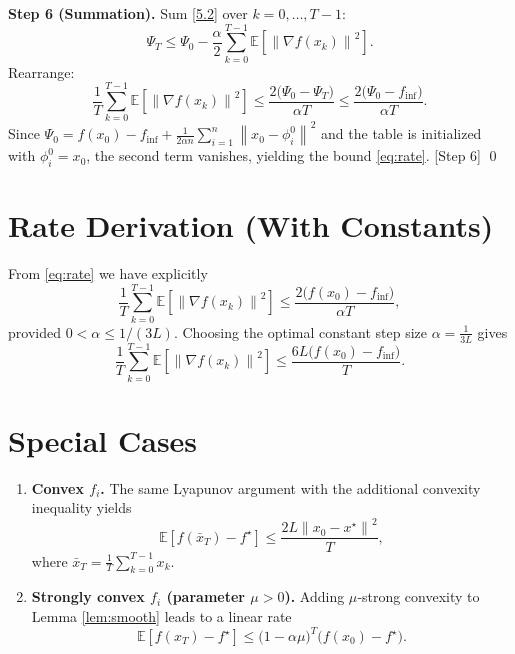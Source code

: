 \documentclass{article}
\newcommand{\E}{\mathbb{E}}
\newcommand{\norm}[1]{\left\|#1\right\|}
\newcommand{\grad}{\nabla}
\begin{document}
\bigskip
\noindent\textbf{Step 6 (Summation).}  
Sum \eqref{5.2} over $k=0,\dots,T-1$:
\[
\Psi_T \le \Psi_0 -\frac{\alpha}{2}\sum_{k=0}^{T-1}\E\!\left[\norm{\grad f(x_k)}^{2}\right].
\]
Rearrange:
\[
\frac{1}{T}\sum_{k=0}^{T-1}\E\!\left[\norm{\grad f(x_k)}^{2}\right]
   \le \frac{2\bigl(\Psi_0-\Psi_T\bigr)}{\alpha T}
   \le \frac{2\bigl(\Psi_0-f_{\inf}\bigr)}{\alpha T}. \tag{6.1}
\]
Since $\Psi_0 = f(x_0)-f_{\inf}+\frac{1}{2\alpha n}\sum_{i=1}^{n}\norm{x_0-\phi_i^{0}}^{2}$ and the table is initialized with $\phi_i^{0}=x_0$, the second term vanishes, yielding the bound \eqref{eq:rate}.  
[Step 6] \qed

\section*{Rate Derivation (With Constants)}
From \eqref{eq:rate} we have explicitly
\[
\frac{1}{T}\sum_{k=0}^{T-1}\E\!\left[\norm{\grad f(x_k)}^{2}\right]
   \le \frac{2\bigl(f(x_0)-f_{\inf}\bigr)}{\alpha T},
\]
provided $0<\alpha\le 1/(3L)$.  
Choosing the optimal constant step size $\alpha = \frac{1}{3L}$ gives
\[
\frac{1}{T}\sum_{k=0}^{T-1}\E\!\left[\norm{\grad f(x_k)}^{2}\right]
   \le \frac{6L\bigl(f(x_0)-f_{\inf}\bigr)}{T}.
\]

\section*{Special Cases}
\begin{enumerate}[label=\alph*.]
\item \textbf{Convex $f_i$.} The same Lyapunov argument with the additional convexity inequality yields
\[
\E\!\left[f(\bar x_T)-f^\star\right]\le \frac{2L\norm{x_0-x^\star}^{2}}{T},
\]
where $\bar x_T=\frac{1}{T}\sum_{k=0}^{T-1}x_k$.
\item \textbf{Strongly convex $f_i$ (parameter $\mu>0$).} Adding $\mu$‑strong convexity to Lemma \ref{lem:smooth} leads to a linear rate
\[
\E\!\left[f(x_T)-f^\star\right]\le\bigl(1-\alpha\mu\bigr)^{T}\bigl(f(x_0)-f^\star\bigr).
\]
\end{enumerate}
\end{document}
